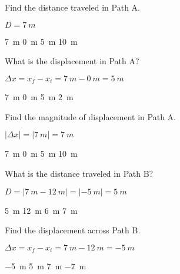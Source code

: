 \documentclass[]{exam}
\begin{document}
\begin{questions}
\question \label{Q1}
Find the distance traveled in Path A.

\ifprintanswers
{\color{red} 
$D = \boxed{\SI{7}{m}}$
}

\smallskip
\fi

\begin{randomizechoices}
    \correctchoice \SI{7}{m}
    \choice \SI{0}{m}
    \choice \SI{5}{m}
    \choice \SI{10}{m}
\end{randomizechoices}

\question
What is the displacement in Path A?

\ifprintanswers
{\color{red} 
$\Delta x = x_f - x_i = \SI{7}{m} - \SI{0}{m} = \boxed{\SI{5}{m}}$
}

\smallskip
\fi

\begin{randomizechoices}
    \correctchoice \SI{7}{m}
    \choice \SI{0}{m}
    \choice \SI{5}{m}
    \choice \SI{2}{m}
\end{randomizechoices}

\ifprintanswers
\else
\clearpage
\fi

\question 
Find the magnitude of displacement in Path A.

\ifprintanswers
{\color{red} 
$|\Delta x| = |\SI{7}{m}| = \boxed{\SI{7}{m}}$
}

\smallskip
\fi

\begin{randomizechoices}
    \correctchoice \SI{7}{m}
    \choice \SI{0}{m}
    \choice \SI{5}{m}
    \choice \SI{10}{m}
\end{randomizechoices}


\question
What is the distance traveled in Path B?

\ifprintanswers
{\color{red} 
$D = \left|\SI{7}{m} - \SI{12}{m}\right| = \left|-\SI{5}{m}\right| = \boxed{\SI{5}{m}}$
}

\smallskip
\fi

\begin{randomizechoices}
    \correctchoice \SI{5}{m}
    \choice \SI{12}{m}
    \choice \SI{6}{m}
    \choice \SI{7}{m}
\end{randomizechoices}


\question 
Find the displacement across Path B.

\ifprintanswers
{\color{red} 
$\Delta x = x_f - x_i = \SI{7}{m} - \SI{12}{m} = \boxed{\SI{-5}{m}}$
}

\smallskip
\fi

\begin{randomizechoices}
    \correctchoice \SI{-5}{m}
    \choice \SI{5}{m}
    \choice \SI{7}{m}
    \choice \SI{-7}{m}
\end{randomizechoices}



\end{questions}
\end{document}
